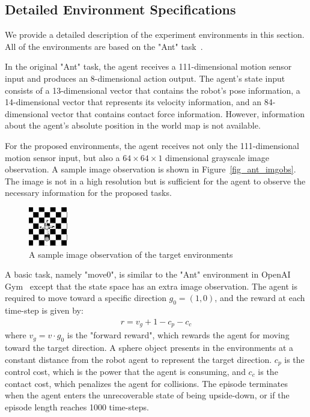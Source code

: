 
\subsection{Detailed Environment Specifications}
We provide a detailed description of the experiment environments in this section. All of the environments are based on the "Ant" task~\cite{openaigym}. 

In the original "Ant" task, the agent receives a 111-dimensional motion sensor input and produces an 8-dimensional action output. The agent's state input consists of a 13-dimensional vector that contains the robot's pose information, a 14-dimensional vector that represents its velocity information, and an 84-dimensional vector that contains contact force information. However, information about the agent's absolute position in the world map is not available.

For the proposed environments, the agent receives not only the 111-dimensional motion sensor input, but also a $64\times 64\times 1$ dimensional grayscale image observation. A sample image observation is shown in Figure~\ref{fig_ant_imgobs}. The image is not in a high resolution but is sufficient for the agent to observe the necessary information for the proposed tasks.

\begin{figure}[H]
	\includegraphics{images/ant_imgobs.png}
	\centering
	\caption{A sample image observation of the target environments}
\end{figure}\label{fig_ant_imgobs}

A basic task, namely "move0", is similar to the "Ant" environment in OpenAI Gym~\cite{openaigym} except that the state space has an extra image observation. The agent is required to move toward a specific direction $g_0=(1,0)$, and the reward at each time-step is given by:
\begin{align}
r = v_g + 1-c_p-c_c
\end{align}
where $v_g=v \cdot g_0$ is the "forward reward", which rewards the agent for moving toward the target direction. A sphere object presents in the environments at a constant distance from the robot agent to represent the target direction.  $c_p$ is the control cost, which is the power that the agent is consuming, and $c_c$ is the contact cost, which penalizes the agent for collisions. The episode terminates when the agent enters the unrecoverable state of being upside-down, or if the episode length reaches 1000 time-steps.

